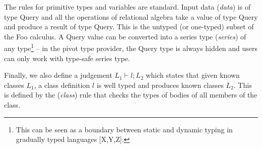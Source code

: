\documentclass[a4paper,UKenglish]{lipics-v2016}
\theoremstyle{plain}
\theoremstyle{definition}
\newcommand{\ident}[1]{\textnormal{\sffamily #1}}
\begin{document}

The rules for primitive types and variables are standard.
Input data (\emph{data}) is of type \ident{Query} and all the operations of relational algebra 
take a value of type \ident{Query} and produce a result of type \ident{Query}. This is the 
untyped (or one-typed) subset of the Foo calculus. A \ident{Query} value can be converted into a
series type (\emph{series}) of any type\footnote{This can be seen as a boundary between static and
dynamic typing in gradually typed languages [X,Y,Z].} -- in the pivot type provider, the 
\ident{Query} type is always hidden and users can only work with type-safe series type.

Finally, we also define a judgement $L_1 \vdash l; L_2$ which states that given known classes $L_1$,
a class definition $l$ is well typed and produces known classes $L_2$. This is defined by the
(\emph{class}) rule that checks the types of bodies of all members of the class.

\end{document}

